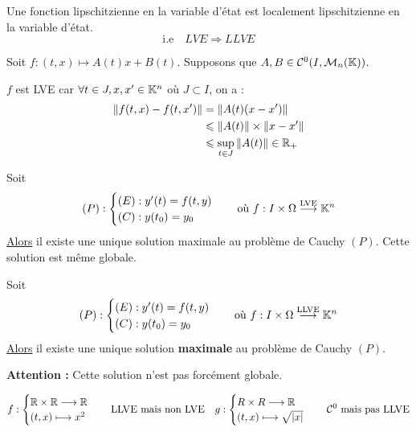\begin{remark}
    Une fonction lipschitzienne en la variable d'état est localement lipschitzienne en la variable d'état. 
    \[ \text{i.e} \quad LVE \Longrightarrow LLVE \] 
\end{remark}

\begin{example}
    Soit $f : (t,x) \longmapsto A(t)x + B(t)$. Supposons que $A, B \in \mathcal{C}^0(I, \mathcal{M}_n(\mathbb{K}))$.

    $f$ est LVE car $ \forall t \in J, x,x' \in \mathbb{K}^n$ où $J \subset I$, on a : 
        \begin{align*}
            \| f(t,x) - f(t,x') \| &= \| A(t) (x-x') \| \\ 
            & \leqslant \| A(t)\| \times \| x-x'\| \\ 
            & \leqslant \sup_{t \in J} \| A(t) \| \in \mathbb{R}_+ 
        \end{align*}
\end{example}

\begin{theorem}
    Soit 
        \[ (P) : 
            \begin{cases}
                (E) : y'(t) = f(t,y) \\ 
                (C) : y(t_0) = y_0
            \end{cases} 
        \quad \text{où } f : I \times \Omega \overset{\text{LVE}}{\longrightarrow} \mathbb{K}^n \] 
    \underline{Alors} il existe une unique solution maximale au problème de Cauchy $(P)$. 
    Cette solution est même globale. 
\end{theorem}

\begin{theorem}
    Soit 
        \[ (P) : 
            \begin{cases}
                (E) : y'(t) = f(t,y) \\ 
                (C) : y(t_0) = y_0
            \end{cases} 
        \quad \text{où } f : I \times \Omega \overset{\text{LLVE}}{\longrightarrow} \mathbb{K}^n \] 
    \underline{Alors} il existe une unique solution \textbf{maximale} au problème de Cauchy $(P)$. 
\end{theorem}

\textbf{Attention : } Cette solution n'est pas forcément globale. 

\begin{example}
    \[ f : 
        \begin{cases}
            \mathbb{R} \times \mathbb{R} \longrightarrow \mathbb{R} \\ 
            (t,x) \longmapsto x^2
        \end{cases} 
        \quad \text{LLVE mais non LVE} 
        \quad  g : 
        \begin{cases}
            R \times R \longrightarrow \mathbb{R} \\ 
            (t,x) \longmapsto \sqrt{|x|}
        \end{cases}
        \quad \mathcal{C}^0 \text{ mais pas LLVE} \] 
\end{example}

